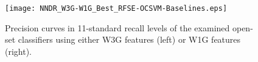 
\begin{figure}[t]
\begin{center}
    \texttt{[image: NNDR\_W3G-W1G\_Best\_RFSE-OCSVM-Baselines.eps]}
	\caption{Precision curves in 11-standard recall levels of the examined open-set classifiers using either W3G features (left) or W1G features (right).}
	\label{fig:NNDR_W3G_Best_RFSE_Baseline}
	\end{center}
\vspace{-7mm}
\end{figure}



